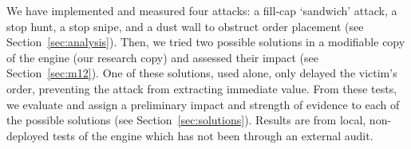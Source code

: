We have implemented and measured four attacks: a fill-cap `sandwich' attack, a stop hunt, a stop snipe, and a dust wall to obstruct order placement (see Section~\ref{sec:analysis}). %
Then, we tried two possible solutions in a modifiable copy of the engine (our research copy) and assessed their impact (see Section~\ref{sec:m12}). %
One of these solutions, used alone, only delayed the victim's order, preventing the attack from extracting immediate value. %
From these tests, we evaluate and assign a preliminary impact and strength of evidence to each of the possible solutions (see Section~\ref{sec:solutions}). %
Results are from local, non-deployed tests of the engine which has not been through an external audit. %
